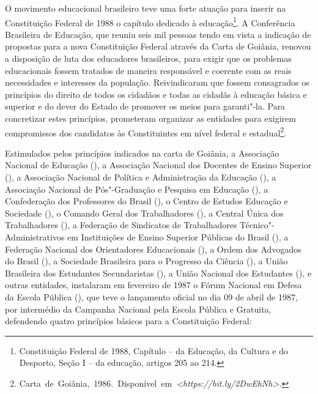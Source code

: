 O movimento educacional brasileiro teve uma forte atuação para inserir
na Constituição Federal de 1988 o capítulo dedicado à educação\footnote{Constituição
  Federal de 1988, Capítulo  -- da Educação, da Cultura e do
  Desporto, Seção I -- da educação, artigos 205 ao 214.}. A  Conferência Brasileira de
Educação, que reuniu seis mil pessoas tendo em vista a indicação de
propostas para a nova Constituição Federal através da Carta de Goiânia,
renovou a disposição de luta dos educadores brasileiros, para exigir que
os problemas educacionais fossem tratados de maneira responsável e
coerente com as reais necessidades e interesses da população.
Reivindicaram que fossem consagrados os princípios do direito de todos
os cidadãos e todas as cidadãs à educação básica e superior e do dever
do Estado de promover os meios para garanti"-la. Para concretizar estes
princípios, prometeram organizar as entidades para exigirem compromissos
dos candidatos às Constituintes em nível federal e estadual\footnote{\mbox{Carta
de Goiânia, 1986. Disponível em \emph{\textless{}https://bit.ly/2DwEhNh\textgreater{}.}}}.

Estimulados pelos princípios indicados na carta de Goiânia, a Associação
Nacional de Educação (), a Associação Nacional dos Docentes de
Ensino Superior (), a Associação Nacional de Política e
Administração da Educação (), a Associação Nacional de
Pós"-Graduação e Pesquisa em Educação (), a Confederação dos
Professores do Brasil (), o Centro de Estudos Educação e Sociedade
(), o Comando Geral dos Trabalhadores (), a Central Única dos
Trabalhadores (), a Federação de Sindicatos de Trabalhadores
Técnico"-Administrativos em Instituições de Ensino Superior Públicas do
Brasil (), a Federação Nacional dos Orientadores Educacionais
(), a Ordem dos Advogados do Brasil (), a Sociedade Brasileira
para o Progresso da Ciência (), a União Brasileira dos Estudantes
Secundaristas (), a União Nacional dos Estudantes (), e outras
entidades, instalaram em fevereiro de 1987 o Fórum Nacional em Defesa da
Escola Pública (), que teve o lançamento oficial no dia 09 de abril
de 1987, por intermédio da Campanha Nacional pela Escola Pública e
Gratuita, defendendo quatro princípios básicos para a Constituição
Federal:

